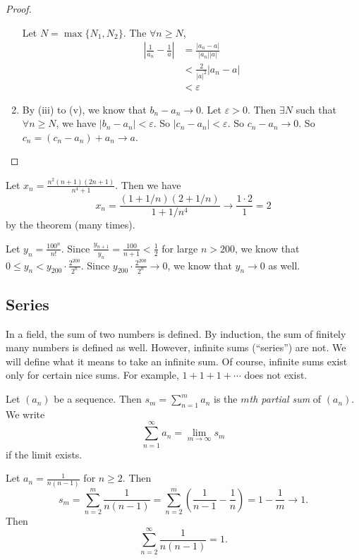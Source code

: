 \documentclass[a4paper]{article}
\begin{document}
\begin{proof}
\begin{enumerate}
      Let $N = \max\{N_1, N_2\}$. The $\forall n \geq N$,
      \begin{align*}
        \left|\frac{1}{a_n} - \frac{1}{a}\right| &= \frac{|a_n - a|}{|a_n||a|}\\
        &< \frac{2}{|a|^2}|a_n - a|\\
        &< \varepsilon
      \end{align*}
    \item By (iii) to (v), we know that $b_n - a_n \to 0$. Let $\varepsilon > 0$. Then $\exists N$ such that $\forall n\geq N$, we have $|b_n - a_n| < \varepsilon$. So $|c_n - a_n| < \varepsilon$. So $c_n - a_n \to 0$. So $c_n = (c_n - a_n) + a_n \to a$.\qedhere
  \end{enumerate}
\end{proof}

\begin{eg}
  Let $x_n = \frac{n^2(n + 1)(2n + 1)}{n^4 + 1}$. Then we have
  \[
    x_n = \frac{(1 + 1/n)(2 + 1/n)}{1 + 1/n^4}\to \frac{1\cdot 2}{1} = 2
  \]
  by the theorem (many times).
\end{eg}

\begin{eg}
  Let $y_n = \frac{100^n}{n!}$. Since $\frac{y_{n + 1}}{y_n} = \frac{100}{n + 1} < \frac{1}{2}$ for large $n > 200$, we know that $0 \leq y_n < y_{200}\cdot \frac{2^{200}}{2^n}$. Since $y_{200}\cdot \frac{2^{200}}{2^n} \to 0$, we know that $y_n\to 0$ as well.
\end{eg}

\subsection{Series}
In a field, the sum of two numbers is defined. By induction, the sum of finitely many numbers is defined as well. However, infinite sums (``series'') are not. We will define what it means to take an infinite sum. Of course, infinite sums exist only for certain nice sums. For example, $1 + 1 + 1 + \cdots$ does not exist.

\begin{defi}
  Let $(a_n)$ be a sequence. Then $s_m = \sum_{n = 1}^m a_n$ is the \emph{$m$th partial sum} of $(a_n)$. We write
  \[
    \sum_{n = 1}^\infty a_n = \lim_{m\to \infty} s_m
  \]
  if the limit exists.
\end{defi}

\begin{eg}
  Let $a_n = \frac{1}{n(n - 1)}$ for $n\geq 2$. Then
  \[
    s_m = \sum_{n = 2}^m \frac{1}{n(n - 1)} = \sum_{n = 2}^m\left(\frac{1}{n - 1} - \frac{1}{n}\right) = 1 - \frac{1}{m}\to 1.
  \]
  Then
  \[
    \sum_{n = 2}^\infty \frac{1}{n(n - 1)} = 1.
  \]
\end{eg}
\end{document}

